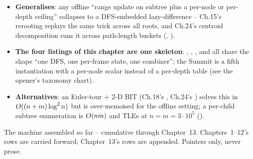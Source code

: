 \begin{hardeningbox}
\begin{itemize}[nosep, leftmargin=1.4em]
  \item \textbf{Generalises}: any offline ``range update on subtree
        plus a per-node or per-depth ceiling'' collapses to a
        DFS-embedded lazy-difference -- Ch.15's rerooting replays the
        same trick across all roots, and Ch.24's centroid decomposition
        runs it across path-length buckets (, ).
  \item \textbf{The four listings of this chapter are one skeleton}:
        , , ,
        and  all share the shape ``one DFS, one
        per-frame state, one combiner''; the Summit is a fifth
        instantiation with a per-node scalar instead of a per-depth
        table (see the opener's taxonomy chart).
  \item \textbf{Alternatives}: an Euler-tour + 2-D BIT (Ch.18's
        , Ch.24's ) solves this in
        $O((n+m)\log^2 n)$ but is over-memoised for the offline
        setting; a per-child subtree enumeration is $O(nm)$ and
        TLEs at $n=m=3\cdot 10^{5}$ ().
\end{itemize}
\end{hardeningbox}


The machine assembled so far -- cumulative through Chapter~13.
Chapters~1--12's rows are carried forward; Chapter~13's rows are
appended. Pointers only, never prose.

